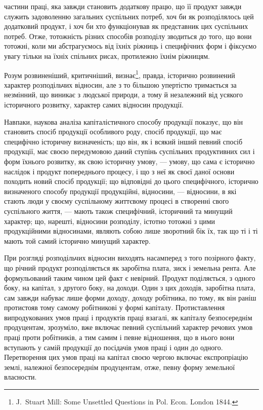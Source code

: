 \parcont{}  %
частини праці, яка завжди становить додаткову працю, що її продукт завжди
служить задоволенню загальних суспільних потреб, хоч би як розподілялось
цей додатковий продукт, і хоч би хто функціонував як представник цих суспільних
потреб. Отже, тотожність різних способів розподілу зводиться до того,
що вони тотожні, коли ми абстрагуємось від їхніх ріжниць і специфічних форм
і фіксуємо увагу тільки на їхніх спільних рисах, протилежно їхнім ріжницям.

Розум розвиненіший, критичніший, визнає\footnote{
J.~Stuart Mill: Some Unsettled Questions in Pol. Econ. London 1844.
}, правда, історично розвинений
характер розподільчих відносин, але з то більшою упертістю тримається за незмінний,
що виникає з людської природи, а тому й незалежний від усякого історичного
розвитку, характер самих відносин продукції.

Навпаки, наукова аналіза капіталістичного способу продукції показує, що
він становить спосіб продукції особливого роду, спосіб продукції, що має специфічно
історичну визначеність; що він, як і всякий інший певний спосіб продукції,
має своєю передумовою даний ступінь суспільних продуктивних сил і
форм їхнього розвитку, як свою історичну умову, — умову, що сама є історично
наслідок і продукт попереднього процесу, і що з неї як своєї даної основи
походить новий спосіб продукції; що відповідні до цього специфічного, історично
визначеного способу продукції продукційні, відносини, — відносини, в які стають
люди у своєму суспільному життєвому процесі в створенні свого суспільного
життя, — мають також специфічний, історичний та минущий характер; що, нарешті,
відносини розподілу, істотно тотожні з цими продукційними відносинами,
являють собою лише зворотний бік їх, так що ті і ті мають той самий
історично минущий характер.

При розгляді розподільчих відносин виходять насамперед з того позірного
факту, що річний продукт розподіляється як заробітна плата, зиск і земельна
рента. Але формульований таким чином цей факт є невірний. Продукт поділяється,
з одного боку, на капітал, з другого боку, на доходи. Один з цих доходів,
заробітна плата, сам завжди набуває лише форми доходу, доходу робітника, по
тому, як він раніш протистояв тому самому робітникові у формі капіталу.
Протиставлення випродукованих умов праці і продуктів праці взагалі, як капіталу
безпосереднім продуцентам, зрозуміло, вже включає певний суспільний характер
речових умов праці проти робітників, а тим самим і певне відношення, що
в нього вони вступають у самій продукції до посідачів умов праці і один
до одного. Перетворення цих умов праці на капітал своєю чергою включає
експропріацію землі, належної безпосереднім продуцентам, отже, певну форму
земельної власности.

